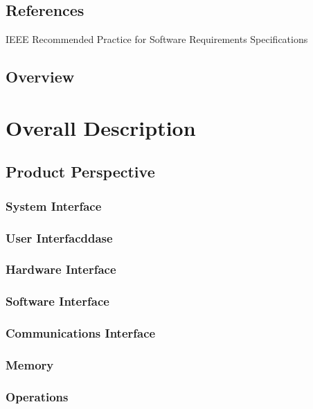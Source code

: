 \documentclass[12pt]{article}
\begin{document}
{        \subsection{References}
			{IEEE Recommended Practice for Software Requirements Specifications}


        \subsection{Overview}


\pagebreak
	\section{Overall Description}


        \subsection{Product Perspective}


        	\subsubsection{System Interface}


            \subsubsection{User Interfacddase}



            \subsubsection{Hardware Interface}


            \subsubsection{Software Interface}


            \subsubsection{Communications Interface}


            \subsubsection{Memory}


            \subsubsection{Operations}


}
\end{document}
